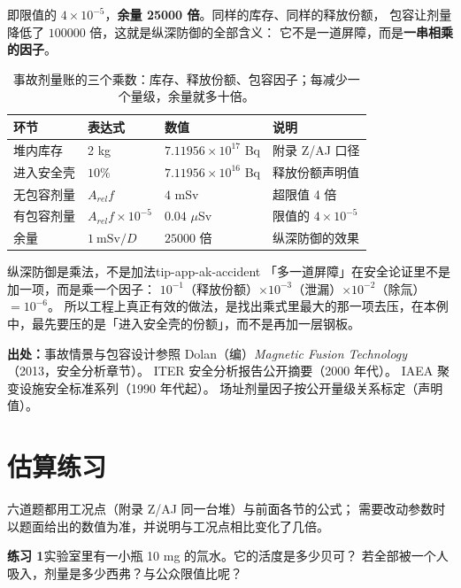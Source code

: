 即限值的 $4\times10^{-5}$，\textbf{余量 25000 倍}。同样的库存、同样的释放份额，
包容让剂量降低了 $100000$ 倍，这就是纵深防御的全部含义：
它不是一道屏障，而是\textbf{一串相乘的因子}。

\begin{table}[htbp]
\centering
\small
\caption{事故剂量账的三个乘数：库存、释放份额、包容因子；每减少一个量级，余量就多十倍。}
\label{tab:app-ak-accident}
\begin{tabular}{p{2.8cm}p{3.3cm}p{3.1cm}p{4.2cm}}
\toprule
环节 & 表达式 & 数值 & 说明 \\
\midrule
堆内库存 & 2 kg & $7.11956\times10^{17}$ Bq & 附录 Z/AJ 口径 \\
进入安全壳 & $10\%$ & $7.11956\times10^{16}$ Bq & 释放份额声明值 \\
无包容剂量 & $A_{rel}f$ & $4$ mSv & 超限值 4 倍 \\
有包容剂量 & $A_{rel}f\times10^{-5}$ & $0.04$ $\mu$Sv & 限值的 $4\times10^{-5}$ \\
余量 & $1\ \mathrm{mSv}/D$ & $25000$ 倍 & 纵深防御的效果 \\
\bottomrule
\end{tabular}

\end{table}

\begin{tip}{纵深防御是乘法，不是加法}{tip-app-ak-accident}
「多一道屏障」在安全论证里不是加一项，而是乘一个因子：
$10^{-1}$（释放份额）$\times10^{-3}$（泄漏）$\times10^{-2}$（除氚）$=10^{-6}$。
所以工程上真正有效的做法，是找出乘式里最大的那一项去压，在本例中，最先要压的是「进入安全壳的份额」，而不是再加一层钢板。
\end{tip}

{\footnotesize
\textbf{出处：}事故情景与包容设计参照 Dolan（编）\emph{Magnetic Fusion Technology}（2013，安全分析章节）。
ITER 安全分析报告公开摘要（2000 年代）。
IAEA 聚变设施安全标准系列（1990 年代起）。
场址剂量因子按公开量级关系标定（声明值）。
}

\section{估算练习}
\label{sec:app-ak-problems}

六道题都用工况点（附录 Z/AJ 同一台堆）与前面各节的公式；
需要改动参数时以题面给出的数值为准，并说明与工况点相比变化了几倍。

\textbf{练习 1}实验室里有一小瓶 10 mg 的氚水。它的活度是多少贝可？
若全部被一个人吸入，剂量是多少西弗？与公众限值比呢？

